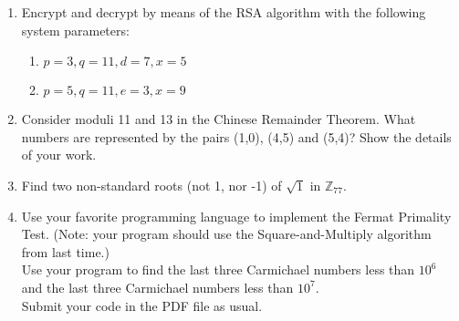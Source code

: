 \documentclass[12pt]{article}
\begin{document}
\begin{enumerate}





\vspace{.25cm}

\item
Encrypt and decrypt by means of the RSA algorithm with the following system parameters: 

\begin{enumerate}

\item
$p=3, q=11, d=7, x = 5$ 

\item
$p=5, q=11, e=3, x=9$ \\
\end{enumerate}


\vspace{.5cm}

\item
Consider moduli 11 and 13 in the Chinese Remainder Theorem. What numbers are represented by the pairs (1,0), (4,5) and (5,4)? Show the details of your work.

\vspace{.5cm}

\item
Find two non-standard roots (not 1, nor -1) of $\sqrt{1}$ in $\mathbb{Z}_{77}$.


\vspace{.5cm}


\item
Use your favorite programming language to implement the Fermat Primality Test.  
(Note: your program should use the Square-and-Multiply algorithm from last time.) \\

Use your program to find  the last three Carmichael numbers less than $10^{6}$ and
the last three Carmichael numbers less than $10^{7}$.  \\

Submit your code in the PDF file as usual. 


\end{enumerate}
\end{document}
